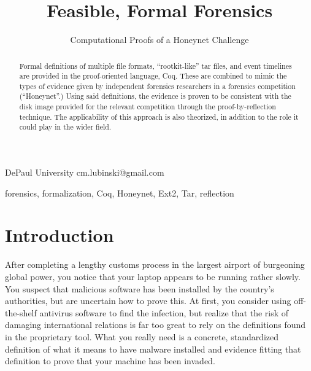 \documentclass[nocopyrightspace,preprint]{sigplanconf}
\begin{document}
\lstset{language=coq, basicstyle=\ttfamily\scriptsize, columns=flexible,
keepspaces=true}

\setlength{\pdfpageheight}{\paperheight}
\setlength{\pdfpagewidth}{\paperwidth}


\preprintfooter{}   %

\title{Feasible, Formal Forensics}
\subtitle{Computational Proofs of a Honeynet Challenge}

           {DePaul University}
           {cm.lubinski@gmail.com}

\maketitle

\begin{abstract}
Formal definitions of multiple file formats, ``rootkit-like'' tar files, and
event timelines are provided in the proof-oriented language, Coq. These are
combined to mimic the types of evidence given by independent forensics
researchers in a forensics competition (``Honeynet''.) Using said definitions,
the evidence is proven to be consistent with the disk image provided for the
relevant competition through the proof-by-reflection technique. The
applicability of this approach is also theorized, in addition to the role it
could play in the wider field.
\end{abstract}

\keywords
forensics, formalization, Coq, Honeynet, Ext2, Tar, reflection

\section{Introduction}

After completing a lengthy customs process in the largest airport of
burgeoning global power, you notice that your laptop appears to be running
rather slowly. You suspect that malicious software has been installed by the
country's authorities, but are uncertain how to prove this. At first, you
consider using off-the-shelf antivirus software to find the infection, but
realize that the risk of damaging international relations is far too great to
rely on the definitions found in the proprietary tool. What you really need
is a concrete, standardized definition of what it means to have malware
installed and evidence fitting that definition to prove that your machine has
been invaded.
\end{document}
